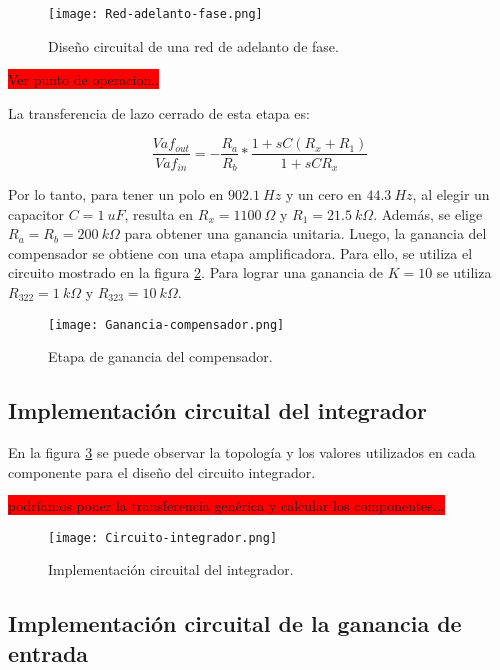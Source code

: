 \begin{figure}[H]
	\centering
	\texttt{[image: Red-adelanto-fase.png]}
	\caption{Diseño circuital de una red de adelanto de fase.}
	\label{fig:red-adelanto-fase}
\end{figure}

\colorbox{red}{Ver punto de operacion..}

\noindent La transferencia de lazo cerrado de esta etapa es:

\begin{equation} 
	\frac{Vaf_{out}}{Vaf_{in}}= - \frac{R_a}{R_b}*\frac{1+sC(R_x+R_1)}{1+sCR_x}
\end{equation}

\noindent Por lo tanto, para tener un polo en $902.1\:Hz$ y un cero en $44.3\:Hz$, al elegir un capacitor $C = 1\:uF$, resulta en $R_x = 1100\:\Omega$ y $R_1 = 21.5\:k\Omega$. Además, se elige $R_a = R_b = 200\:k\Omega$ para obtener una ganancia unitaria. Luego, la ganancia del compensador se obtiene con una etapa amplificadora.
Para ello, se utiliza el circuito mostrado en la figura \ref{fig:ganancia-compensador}. Para lograr una ganancia de $K=10$ se utiliza $R_{322} = 1\:k\Omega$ y $R_{323} = 10\:k\Omega$.


\begin{figure}[H]
	\centering
	\texttt{[image: Ganancia-compensador.png]}
	\caption{Etapa de ganancia del compensador.}
	\label{fig:ganancia-compensador}
\end{figure}

\subsection{Implementación circuital del integrador}

\noindent En la figura \ref{fig:circuito-integrador} se puede observar la topología y los valores utilizados en cada componente para el diseño del circuito integrador.

\colorbox{red}{podríamos poner la transferencia genérica y calcular los componentes...} 

\begin{figure}[H]
	\centering
	\texttt{[image: Circuito-integrador.png]}
	\caption{Implementación circuital del integrador.}
	\label{fig:circuito-integrador}
	\end{figure}


\subsection{Implementación circuital de la ganancia de entrada}


